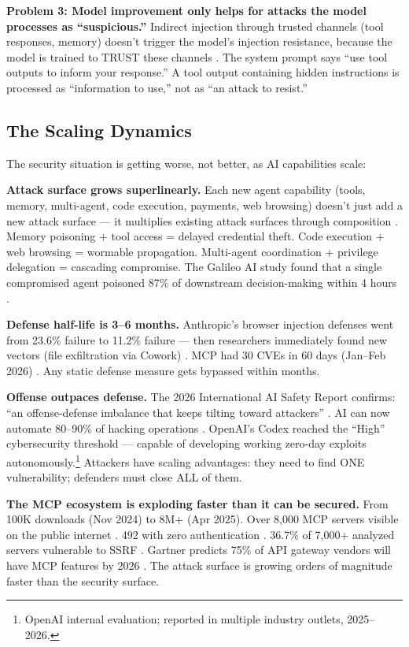 \documentclass[11pt,letterpaper]{article}
\begin{document}
\textbf{Problem 3: Model improvement only helps for attacks the model processes as ``suspicious.''} Indirect injection through trusted channels (tool responses, memory) doesn't trigger the model's injection resistance, because the model is trained to TRUST these channels \cite{kim2026,chhabra2025}. The system prompt says ``use tool outputs to inform your response.'' A tool output containing hidden instructions is processed as ``information to use,'' not as ``an attack to resist.''


\subsection{The Scaling Dynamics}

The security situation is getting worse, not better, as AI capabilities scale:

\textbf{Attack surface grows superlinearly.} Each new agent capability (tools, memory, multi-agent, code execution, payments, web browsing) doesn't just add a new attack surface --- it multiplies existing attack surfaces through composition \cite{kim2026,securitymodeling}. Memory poisoning + tool access = delayed credential theft. Code execution + web browsing = wormable propagation. Multi-agent coordination + privilege delegation = cascading compromise. The Galileo AI study found that a single compromised agent poisoned 87\% of downstream decision-making within 4 hours \cite{galileo}.

\textbf{Defense half-life is 3--6 months.} Anthropic's browser injection defenses went from 23.6\% failure to 11.2\% failure --- then researchers immediately found new vectors (file exfiltration via Cowork) \cite{anthropicrates}. MCP had 30 CVEs in 60 days (Jan--Feb 2026) \cite{checkmarx,cosai}. Any static defense measure gets bypassed within months.

\textbf{Offense outpaces defense.} The 2026 International AI Safety Report confirms: ``an offense-defense imbalance that keeps tilting toward attackers'' \cite{aisafety}. AI can now automate 80--90\% of hacking operations \cite{trendmicro}. OpenAI's Codex reached the ``High'' cybersecurity threshold --- capable of developing working zero-day exploits autonomously.\footnote{OpenAI internal evaluation; reported in multiple industry outlets, 2025--2026.} Attackers have scaling advantages: they need to find ONE vulnerability; defenders must close ALL of them.

\textbf{The MCP ecosystem is exploding faster than it can be secured.} From 100K downloads (Nov 2024) to 8M+ (Apr 2025). Over 8,000 MCP servers visible on the public internet \cite{checkmarx,paloalto}. 492 with zero authentication \cite{checkmarx}. 36.7\% of 7,000+ analyzed servers vulnerable to SSRF \cite{checkmarx}. Gartner predicts 75\% of API gateway vendors will have MCP features by 2026 \cite{gartner}. The attack surface is growing orders of magnitude faster than the security surface.
\end{document}
